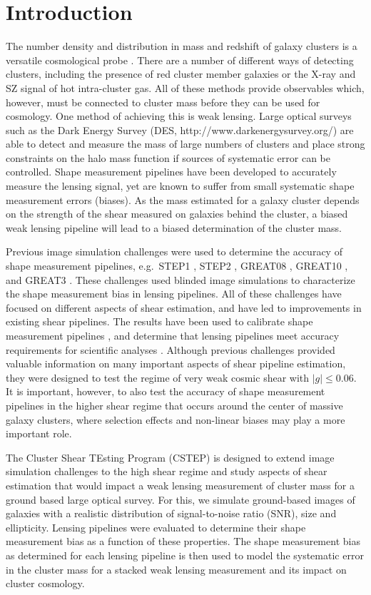 \documentclass[useAMS,usenatbib]{mn2e}
\begin{document}
\section{Introduction}
The number density and distribution in mass and redshift of galaxy
clusters is a versatile cosmological probe \citep[cf.][for a recent review]{Allen}. There are a number
of different ways of detecting clusters, including the presence of red cluster member galaxies or the X-ray and SZ signal of hot intra-cluster gas.
All of these methods provide observables which, however, must be connected to cluster mass before they can be used for cosmology. One method of achieving this is 
weak lensing. Large optical surveys such as the Dark Energy Survey (DES, http://www.darkenergysurvey.org/) are able to detect and measure the
mass of large numbers of clusters and place strong constraints on the
halo mass function if sources of systematic error can be controlled.
Shape measurement pipelines have been developed to accurately measure the lensing signal, yet are known
to suffer from small systematic shape measurement errors (biases). As the mass estimated for a galaxy cluster depends on the strength of the
shear measured on galaxies behind the cluster, a biased weak lensing
pipeline will lead to a biased determination of the cluster mass.
 
Previous image simulation challenges were used to determine
the accuracy of shape measurement pipelines, e.g.~STEP1 \citep{STEP1},
STEP2 \citep{STEP2}, GREAT08 \citep{GREAT08}, GREAT10
\citep{GREAT10}, and GREAT3 \citep{great3}. These challenges used blinded image
simulations to characterize the shape measurement bias in
 lensing pipelines. All of these challenges have focused on
different aspects of shear estimation, and have led to
improvements in existing shear pipelines. The results have been
used to calibrate shape measurement pipelines \citep[e.g.][]{Apple},
and determine that lensing pipelines meet accuracy requirements for scientific
analyses \citep[e.g.][]{Berge}. Although previous challenges provided valuable information on many important
aspects of shear pipeline estimation, they were designed to test the regime of very weak cosmic shear with $|g| \leq 0.06$. 
It is important, however, to also test the accuracy of shape measurement
pipelines in the higher shear regime that occurs around the center of
massive galaxy clusters, where selection effects and non-linear biases
may play a more important role.


The Cluster Shear TEsting Program (CSTEP) is designed to extend image
simulation challenges to the high shear regime and study aspects of
shear estimation that would impact a weak lensing measurement of
cluster mass for a ground based large optical survey. For this, we
simulate ground-based images of galaxies with a realistic
distribution of signal-to-noise ratio (SNR), size and ellipticity. Lensing pipelines
were evaluated to determine their shape measurement bias as a
function of these properties. The shape measurement bias as 
determined for each lensing pipeline is then used to model the 
systematic error in the cluster mass for a stacked weak lensing measurement and its impact on cluster cosmology.
\end{document}
